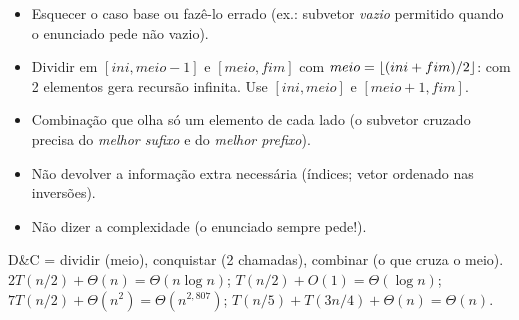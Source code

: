 \begin{cuidado}
\begin{itemize}
  \item Esquecer o caso base ou fazê-lo errado (ex.: subvetor \emph{vazio} permitido quando o enunciado pede não vazio).
  \item Dividir em $[ini,meio-1]$ e $[meio,fim]$ com $meio=\lfloor(ini+fim)/2\rfloor$: com 2 elementos gera recursão infinita. Use $[ini,meio]$ e $[meio+1,fim]$.
  \item Combinação que olha só um elemento de cada lado (o subvetor cruzado precisa do \emph{melhor sufixo} e do \emph{melhor prefixo}).
  \item Não devolver a informação extra necessária (índices; vetor ordenado nas inversões).
  \item Não dizer a complexidade (o enunciado sempre pede!).
\end{itemize}
\end{cuidado}

\begin{chave}
D\&C = dividir (meio), conquistar (2 chamadas), combinar (o que cruza o meio). $2T(n/2)+\Theta(n)=\Theta(n\log n)$; $T(n/2)+O(1)=\Theta(\log n)$; $7T(n/2)+\Theta(n^2)=\Theta(n^{2{,}807})$; $T(n/5)+T(3n/4)+\Theta(n)=\Theta(n)$.
\end{chave}

